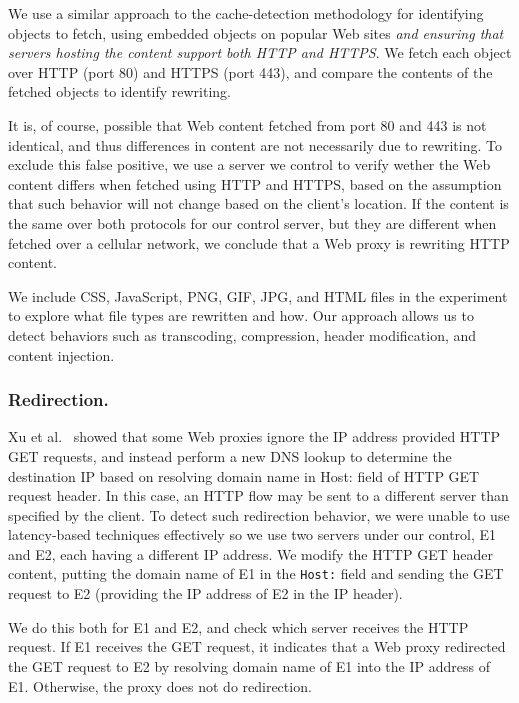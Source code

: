 We use a similar approach to the cache-detection methodology for identifying objects to fetch, using embedded objects on popular Web sites \emph{and ensuring that servers hosting the content support both HTTP and HTTPS}. We fetch each object over HTTP (port 80) and HTTPS (port 443), and compare the contents of the fetched objects to identify rewriting. 

It is, of course, possible that Web content fetched from port 80 and 443 is not identical, and thus differences in content are not necessarily due to rewriting. To exclude this false positive, we use a server we control to verify wether the Web content differs when fetched using HTTP and HTTPS, based on the assumption that such behavior will not change based on the client's location. If the content is the same over both protocols for our control server, but they are different when fetched over a cellular network, we conclude that a Web proxy is rewriting HTTP content. 

We include CSS, JavaScript, PNG, GIF, JPG, and HTML files in the experiment to explore what file types are rewritten and how. Our approach allows us to detect behaviors such as transcoding, compression, header modification, and content injection.



\vspace{-1em}
\subsubsection{Redirection.}

Xu et al.~\cite{xu-transparent-proxies} showed that some Web proxies ignore the IP address provided HTTP GET requests, and instead perform a new DNS lookup to determine the destination IP based on resolving domain name in Host: field of HTTP GET request header. In this case, an HTTP flow may be sent to a different server than specified by the client. To detect such redirection behavior, we were unable to use latency-based techniques effectively so we use two servers under our control, E1 and E2, each having a different IP address. We modify the HTTP GET header content, putting the domain name of E1 in the {\tt Host:} field and sending the GET request to E2 (providing the IP address of E2 in the IP header). 

We do this both for E1 and E2, and check which server receives the HTTP request. If E1 receives the GET request, it indicates that a Web proxy redirected the GET request to E2 by resolving domain name of E1 into the IP address of E1. Otherwise, the proxy does not do redirection.